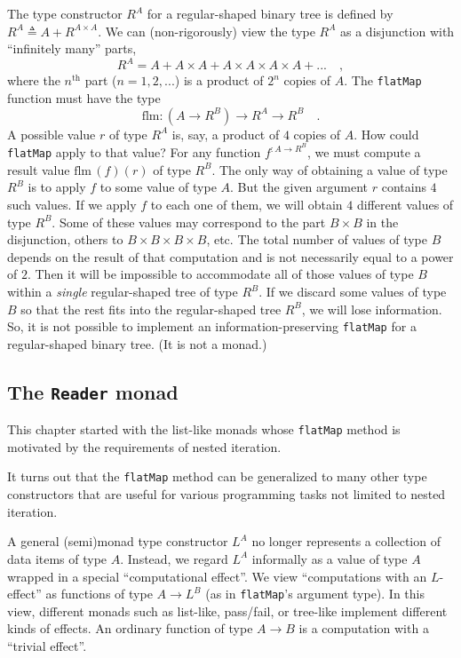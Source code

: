 The type constructor $R^{A}$ for a regular-shaped binary tree is
defined by $R^{A}\triangleq A+R^{A\times A}$. We can (non-rigorously)
view the type $R^{A}$ as a disjunction with \textsf{``}infinitely many\textsf{''}
parts,
\[
R^{A}=A+A\times A+A\times A\times A\times A+...\quad,
\]
where the $n^{\text{th}}$ part ($n=1,2,...$) is a product of $2^{n}$
copies of $A$. The \lstinline!flatMap! function must have the type
\[
\text{flm}:(A\rightarrow R^{B})\rightarrow R^{A}\rightarrow R^{B}\quad.
\]
A possible value $r$ of type $R^{A}$ is, say, a product of $4$
copies of $A$. How could \lstinline!flatMap! apply to that value?
For any function $f^{:A\rightarrow R^{B}}$, we must compute a result
value $\text{flm}\,(f)(r)$ of type $R^{B}$. The only way of obtaining
a value of type $R^{B}$ is to apply $f$ to some value of type $A$.
But the given argument $r$ contains $4$ such values. If we apply
$f$ to each one of them, we will obtain $4$ different values of
type $R^{B}$. Some of these values may correspond to the part $B\times B$
in the disjunction, others to $B\times B\times B\times B$, etc. The
total number of values of type $B$ depends on the result of that
computation and is not necessarily equal to a power of $2$. Then
it will be impossible to accommodate all of those values of type $B$
within a \emph{single} regular-shaped tree of type $R^{B}$. If we
discard some values of type $B$ so that the rest fits into the regular-shaped
tree $R^{B}$, we will lose information. So, it is not possible to
implement an information-preserving \lstinline!flatMap! for a regular-shaped
binary tree. (It is not a monad.)

\subsection{The \texttt{Reader} monad\label{subsec:The-Reader-monad}}

This chapter started
with the list-like monads whose \lstinline!flatMap! method is motivated
by the requirements of nested iteration. %
\begin{comment}
We then looked at tree-like monads, which generalize nested list iterations
to tree grafting. 
\end{comment}
It turns out that the \lstinline!flatMap! method can be generalized
to many other type constructors that are useful for various programming
tasks not limited to nested iteration.

A general (semi)monad type constructor $L^{A}$ no longer represents
a collection of data items of type $A$. Instead, we regard $L^{A}$
informally as a value of type $A$ wrapped in a special \textsf{``}computational
effect\textsf{''}. We view \textsf{``}computations with an $L$-effect\textsf{''} as functions
of type $A\rightarrow L^{B}$ (as in \lstinline!flatMap!\textsf{'}s argument
type). In this view, different monads \textemdash{} such as list-like,
pass/fail, or tree-like \textemdash{} implement different kinds of
effects. An ordinary function of type $A\rightarrow B$ is a computation
with a \textsf{``}trivial effect\textsf{''}.

